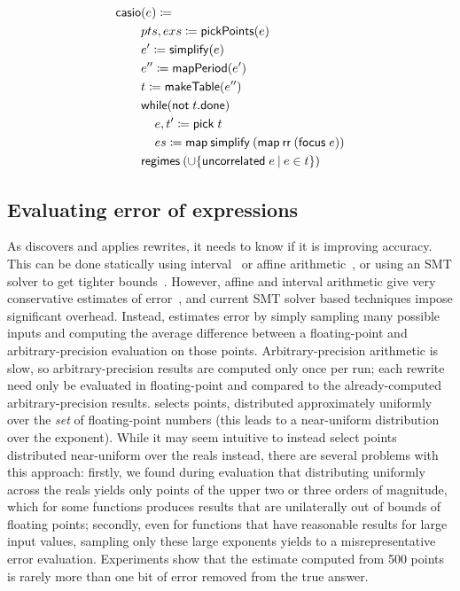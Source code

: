 \documentclass[paper.tex]{subfiles}
\begin{document}
\begin{figure}
\begin{footnotesize}
\begin{align*}
  \|casio|&(e) \ceq \\
  & pts, exs \ceq \|pickPoints|(e) \\
  & e' \ceq \|simplify|(e) \\
  & e'' \ceq \|mapPeriod|(e') \\
  & t \ceq \|makeTable|(e'') \\
  & \|while|(\|not| \; t.\|done|) \\
  & \;\;\;\; e, t' \ceq \|pick|\;t \\
  & \;\;\;\; es \ceq \|map|\:\|simplify|\:(\|map|\:\|rr|\:(\|focus|\;e)) \\
  & \|regimes|\:(\cup\{\|uncorrelated|\;e \I e \in t \})
\end{align*}
\end{footnotesize}
\caption{}
\end{figure}

\subsection{Evaluating error of expressions}

As \casio discovers and applies rewrites,
  it needs to know if it is improving accuracy.
This can be done statically using interval~\cite{} or affine arithmetic~\cite{},
  or using an SMT solver to get tighter bounds~\cite{}.
However, affine and interval arithmetic give
  very conservative estimates of error~\cite{},
  and current SMT solver based techniques impose significant overhead.
Instead, \casio estimates error by simply sampling many possible inputs
  and computing the average difference between a floating-point
  and arbitrary-precision evaluation on those points.
Arbitrary-precision arithmetic is slow,
  so arbitrary-precision results are computed only once per run;
  each rewrite need only be evaluated in floating-point
  and compared to the already-computed arbitrary-precision results.
\casio selects \nSample points, distributed approximately uniformly
  over the \emph{set} of floating-point numbers
  (this leads to a near-uniform distribution over the exponent).
While it may seem intuitive to instead select points
  distributed near-uniform over the reals instead,
  there are several problems with this approach:
firstly, we found during evaluation
  that distributing uniformly across the reals
  yields only points of the upper two or three orders of magnitude,
  which for some functions produces results
  that are unilaterally out of bounds of floating points;
secondly, even for functions that have reasonable results for large input values,
  sampling only these large exponents yields to a misrepresentative error evaluation.
Experiments show that the estimate computed from 500 points
  is rarely more than one bit of error removed from the true answer.
\end{document}
